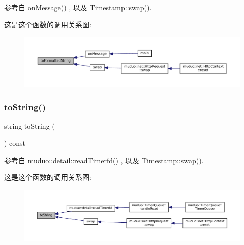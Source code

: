 参考自 on\+Message() , 以及 Timestamp\+::swap().

这是这个函数的调用关系图\+:
\nopagebreak
\begin{figure}[H]
\begin{center}
\leavevmode
\includegraphics[width=350pt]{classmuduo_1_1Timestamp_ac8bf4663993962a4d68d4a6c44588e97_icgraph}
\end{center}
\end{figure}
\mbox{\label{classmuduo_1_1Timestamp_a133cf5030cda633035ca97147356f2f9}} 
\subsubsection{\texorpdfstring{to\+String()}{toString()}}
{\footnotesize\ttfamily string to\+String (\begin{DoxyParamCaption}{ }\end{DoxyParamCaption}) const}



参考自 muduo\+::detail\+::read\+Timerfd() , 以及 Timestamp\+::swap().

这是这个函数的调用关系图\+:
\nopagebreak
\begin{figure}[H]
\begin{center}
\leavevmode
\includegraphics[width=350pt]{classmuduo_1_1Timestamp_a133cf5030cda633035ca97147356f2f9_icgraph}
\end{center}
\end{figure}
\mbox{\label{classmuduo_1_1Timestamp_a315419f26d3c59fa143b49b90a019049}} 
